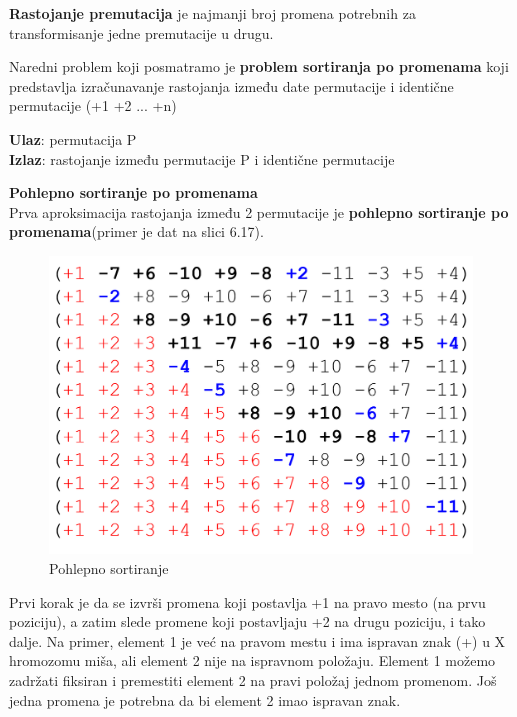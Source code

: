 \begin{definicija}{\textbf{Rastojanje premutacija} je najmanji broj promena potrebnih za transformisanje jedne premutacije u drugu.}
\end{definicija}

\noindent Naredni problem koji posmatramo je \textbf{problem sortiranja po promenama} koji predstavlja izračunavanje rastojanja između date permutacije i identične permutacije (+1 +2 ... +n)

\textbf{Ulaz}: permutacija P\\
\indent \textbf{Izlaz}: rastojanje između permutacije P i identične permutacije\\

\vspace{1cm}

\hspace{2cm} \textbf{Pohlepno sortiranje po promenama}\\

Prva aproksimacija rastojanja između 2 permutacije je \textbf{pohlepno sortiranje po promenama}(primer je dat na slici 6.17).\\

\begin{figure}[h!]
\centering
\includegraphics[scale=0.4]{poglavlja/6/slike/greedy_sort.png}
\caption{Pohlepno sortiranje}
\label{slika:X}
\end{figure}

Prvi korak je da se izvrši promena koji postavlja +1 na pravo mesto (na prvu poziciju), a zatim slede promene koji postavljaju
+2 na drugu poziciju, i tako dalje. Na primer, element 1 je već na pravom mestu i ima ispravan znak (+) u X hromozomu miša, ali element 2 nije na ispravnom položaju. Element 1 možemo zadržati fiksiran i premestiti element 2 na pravi položaj jednom promenom. Još jedna promena je potrebna da bi element 2 imao ispravan znak.\\

